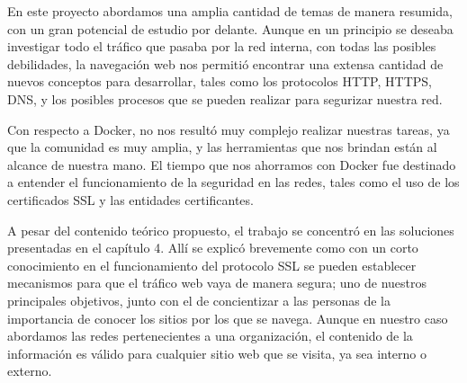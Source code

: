 
En este proyecto abordamos una amplia cantidad de temas de manera resumida, con un gran potencial 
de estudio por delante. Aunque en un principio se deseaba investigar todo el tráfico que pasaba por 
la red interna, con todas las posibles debilidades, la navegación web nos permitió encontrar una 
extensa cantidad de nuevos conceptos para desarrollar, tales como los protocolos HTTP, HTTPS, DNS, 
y los posibles procesos que se pueden realizar para segurizar nuestra red.

Con respecto a Docker, no nos resultó muy complejo realizar nuestras tareas, ya que la comunidad 
es muy amplia, y las herramientas que nos brindan están al alcance de nuestra mano. El tiempo que 
nos ahorramos con Docker fue destinado a entender el funcionamiento de la seguridad en las redes, 
tales como el uso de los certificados SSL y las entidades certificantes.

A pesar del contenido teórico propuesto, el trabajo se concentró en las soluciones presentadas 
en el capítulo 4. Allí se explicó brevemente como con un corto conocimiento en el funcionamiento 
del protocolo SSL se pueden establecer mecanismos para que el tráfico web vaya de manera segura; 
uno de nuestros principales objetivos, junto con el de concientizar a las personas de la 
importancia de conocer los sitios por los que se navega. Aunque en nuestro caso abordamos las 
redes pertenecientes a una organización, el contenido de la información es válido para cualquier 
sitio web que se visita, ya sea interno o externo. 
